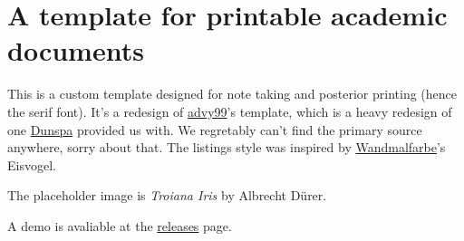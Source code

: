 \section{A  template for printable academic documents}

This is a custom  template designed for note taking and posterior printing (hence the serif font).
It's a redesign of \href{https://github.com/advy99}{advy99}'s template, which is a heavy redesign of one \href{https://github.com/Dunspa}{Dunspa} provided us with.
We regretably can't find the primary source anywhere, sorry about that.
The listings style was inspired by \href{https://github.com/Wandmalfarbe}{Wandmalfarbe}'s Eisvogel.

The placeholder image  is \textit{Troiana Iris} by Albrecht Dürer.

A demo is avaliable at the \href{https://github.com/Groctel/aqademia/releases}{releases} page.
